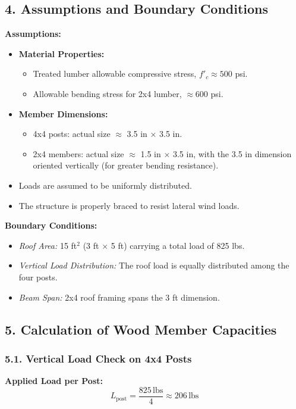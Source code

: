 \documentclass[12pt]{article}
\begin{document}
\subsection*{4. Assumptions and Boundary Conditions}
\textbf{Assumptions:}
\begin{itemize}
    \item \textbf{Material Properties:}
    \begin{itemize}
        \item Treated lumber allowable compressive stress, \(f'_c \approx 500\) psi.
        \item Allowable bending stress for 2x4 lumber, \(\approx 600\) psi.
    \end{itemize}
    \item \textbf{Member Dimensions:}
    \begin{itemize}
        \item 4x4 posts: actual size $\approx$ 3.5 in $\times$ 3.5 in.
        \item 2x4 members: actual size $\approx$ 1.5 in $\times$ 3.5 in, with the 3.5 in dimension oriented vertically (for greater bending resistance).
    \end{itemize}
    \item Loads are assumed to be uniformly distributed.
    \item The structure is properly braced to resist lateral wind loads.
\end{itemize}

\textbf{Boundary Conditions:}
\begin{itemize}
    \item \emph{Roof Area:} 15 ft\(^2\) (3 ft $\times$ 5 ft) carrying a total load of 825 lbs.
    \item \emph{Vertical Load Distribution:} The roof load is equally distributed among the four posts.
    \item \emph{Beam Span:} 2x4 roof framing spans the 3 ft dimension.
\end{itemize}

\subsection*{5. Calculation of Wood Member Capacities}

\subsubsection*{5.1. Vertical Load Check on 4x4 Posts}
\textbf{Applied Load per Post:}
\[
L_{\text{post}} = \frac{825\,\text{lbs}}{4} \approx 206\,\text{lbs}
\]
\end{document}
